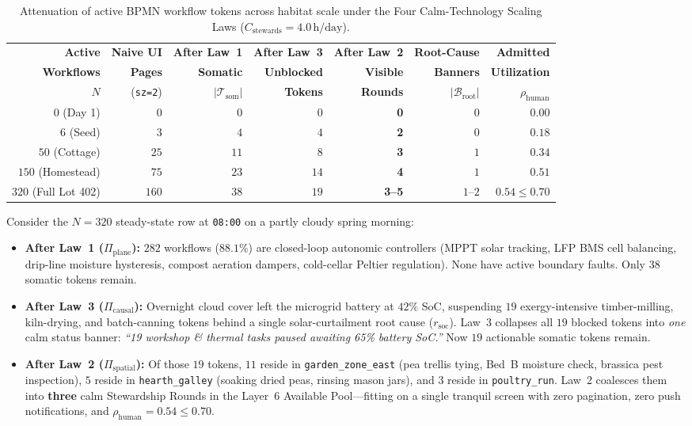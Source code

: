 \begin{table}[htbp]
\centering
\caption{Attenuation of active BPMN workflow tokens across habitat scale under the Four Calm-Technology Scaling Laws ($C_{\text{stewards}} = 4.0\,\text{h/day}$).}
\label{tab:calm-scaling-benchmark}
\footnotesize
\begin{tabular}{@{}rrrrrrr@{}}
\toprule
\textbf{Active} & \textbf{Naive UI} & \textbf{After Law~1} & \textbf{After Law~3} & \textbf{After Law~2} & \textbf{Root-Cause} & \textbf{Admitted} \\
\textbf{Workflows} & \textbf{Pages} & \textbf{Somatic} & \textbf{Unblocked} & \textbf{Visible} & \textbf{Banners} & \textbf{Utilization} \\
$N$ & (\texttt{sz=2}) & $|\mathcal{T}_{\text{som}}|$ & \textbf{Tokens} & \textbf{Rounds} & $|\mathcal{B}_{\text{root}}|$ & $\rho_{\text{human}}$ \\
\midrule
$0$ (Day 1) & $0$ & $0$ & $0$ & \textbf{0} & $0$ & $0.00$ \\
$6$ (Seed) & $3$ & $4$ & $4$ & \textbf{2} & $0$ & $0.18$ \\
$50$ (Cottage) & $25$ & $11$ & $8$ & \textbf{3} & $1$ & $0.34$ \\
$150$ (Homestead) & $75$ & $23$ & $14$ & \textbf{4} & $1$ & $0.51$ \\
$320$ (Full Lot 402) & $160$ & $38$ & $19$ & \textbf{3--5} & $1\text{--}2$ & $0.54 \le 0.70$ \\
\bottomrule
\end{tabular}
\end{table}

Consider the $N = 320$ steady-state row at \texttt{08:00} on a partly cloudy spring morning:
\begin{itemize}
  \item \textbf{After Law~1 ($\Pi_{\text{plane}}$):} $282$ workflows ($88.1\%$) are closed-loop autonomic controllers (MPPT solar tracking, LFP BMS cell balancing, drip-line moisture hysteresis, compost aeration dampers, cold-cellar Peltier regulation). None have active boundary faults. Only $38$ somatic tokens remain.
  \item \textbf{After Law~3 ($\Pi_{\text{causal}}$):} Overnight cloud cover left the microgrid battery at $42\%$ SoC, suspending $19$ exergy-intensive timber-milling, kiln-drying, and batch-canning tokens behind a single solar-curtailment root cause ($r_{\text{soc}}$). Law~3 collapses all $19$ blocked tokens into \emph{one} calm status banner: \emph{``19 workshop \& thermal tasks paused awaiting 65\% battery SoC.''} Now $19$ actionable somatic tokens remain.
  \item \textbf{After Law~2 ($\Pi_{\text{spatial}}$):} Of those $19$ tokens, $11$ reside in \texttt{garden\_zone\_east} (pea trellis tying, Bed~B moisture check, brassica pest inspection), $5$ reside in \texttt{hearth\_galley} (soaking dried peas, rinsing mason jars), and $3$ reside in \texttt{poultry\_run}. Law~2 coalesces them into \textbf{three} calm Stewardship Rounds in the Layer~6 Available Pool---fitting on a single tranquil screen with zero pagination, zero push notifications, and $\rho_{\text{human}} = 0.54 \le 0.70$.
\end{itemize}

